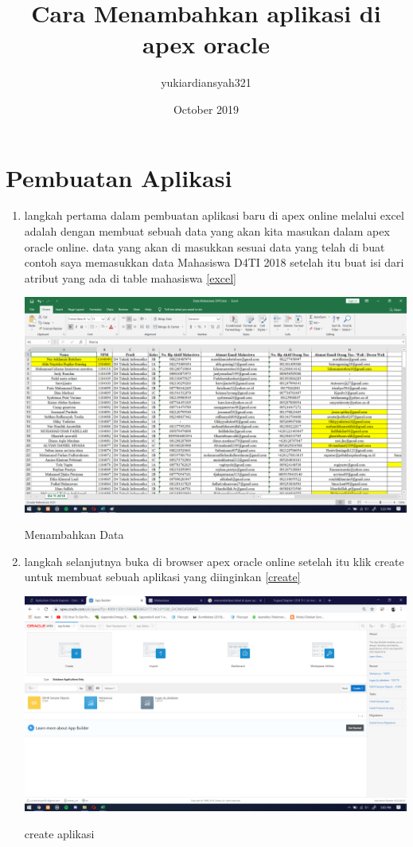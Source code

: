 \documentclass{article}
\title{Cara Menambahkan aplikasi di apex oracle}
\author{yukiardiansyah321 }
\date{October 2019}
\begin{document}
\maketitle

\section{Pembuatan Aplikasi}

\begin{enumerate}
    \item langkah pertama dalam pembuatan aplikasi baru di apex online melalui excel adalah dengan membuat sebuah data yang akan kita masukan dalam apex oracle online. data yang akan di masukkan sesuai data yang telah di buat contoh saya memasukkan data Mahasiswa D4TI 2018 
    setelah itu buat isi dari atribut yang ada di table mahasiswa
    \ref{excel}
    \begin{center}
         \centering
            \includegraphics[scale=0.27]{figures/DB0.png}
        \caption{Menambahkan Data}
        \label{excel}
    \end{center}
       
     \item langkah selanjutnya buka di browser apex oracle online setelah itu klik create untuk membuat sebuah aplikasi yang diinginkan
      \ref{create}
    \begin{center}
         \centering
            \includegraphics[scale=0.27]{figures/DB1.png}
        \caption{create aplikasi}
        \label{create}
    \end{center}
    

\end{enumerate}
\end{document}

